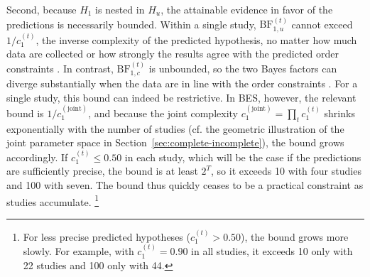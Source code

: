 \documentclass[letterpaper,11pt,oneside]{article}
\begin{document}
Second, because $H_1$ is nested in $H_u$, the attainable evidence in favor of the predictions is necessarily bounded. Within a single study, $\mathrm{BF}_{1,u}^{(t)}$ cannot exceed $1/c_1^{(t)}$, the inverse complexity of the predicted hypothesis, no matter how much data are collected or how strongly the results agree with the predicted order constraints \parencite{heckTestingOrderConstraints2015, klugkistBayesianEvidenceSynthesis2025}. In contrast, $\mathrm{BF}_{1,c}^{(t)}$ is unbounded, so the two Bayes factors can diverge substantially when the data are in line with the order constraints \parencite{shiffrinBayesFactorsRelations2016}. For a single study, this bound can indeed be restrictive. In BES, however, the relevant bound is $1/c_1^{(\text{joint})}$, and because the joint complexity $c_1^{(\text{joint})} = \prod_t c_1^{(t)}$ shrinks exponentially with the number of studies (cf. the geometric illustration of the joint parameter space in Section~\ref{sec:complete-incomplete}), the bound grows accordingly. If $c_1^{(t)} \le 0.50$ in each study, which will be the case if the predictions are sufficiently precise, the bound is at least $2^T$, so it exceeds 10 with four studies and 100 with seven. The bound thus quickly ceases to be a practical constraint as studies accumulate.%
    \footnote{For less precise predicted hypotheses ($c_1^{(t)}>0.50$), the bound grows more slowly. For example, with $c_1^{(t)}=0.90$ in all studies, it exceeds 10 only with 22 studies and 100 only with 44.}
\end{document}
